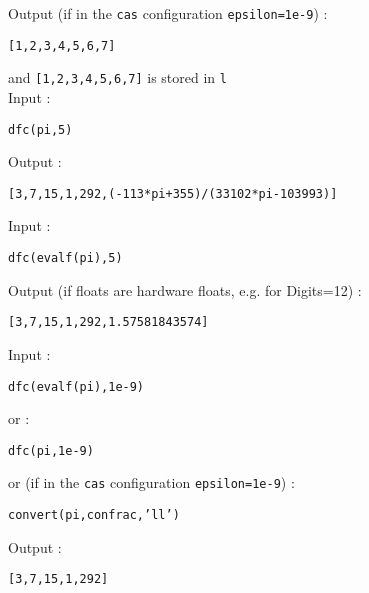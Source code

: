 \documentclass[a4paper,11pt]{book}
\begin{document}
Output (if in the {\tt cas} configuration {\tt epsilon=1e-9}) :
\begin{center}{\tt [1,2,3,4,5,6,7]}\end{center} 
and {\tt [1,2,3,4,5,6,7]} is stored in {\tt l}\\
Input :
\begin{center}{\tt dfc(pi,5)}\end{center}
Output :
\begin{center}{\tt [3,7,15,1,292,(-113*pi+355)/(33102*pi-103993)]}\end{center} 
Input :
\begin{center}{\tt dfc(evalf(pi),5)}\end{center}
Output (if floats are hardware floats, e.g. for Digits=12) :
\begin{center}{\tt [3,7,15,1,292,1.57581843574]}\end{center} 
Input :
\begin{center}{\tt dfc(evalf(pi),1e-9)}\end{center}
or :
\begin{center}{\tt dfc(pi,1e-9)}\end{center}
or (if in the {\tt cas} configuration {\tt epsilon=1e-9}) :
\begin{center}{\tt convert(pi,confrac,'ll')}\end{center}
Output :
\begin{center}{\tt [3,7,15,1,292]}\end{center} 
\end{document}

